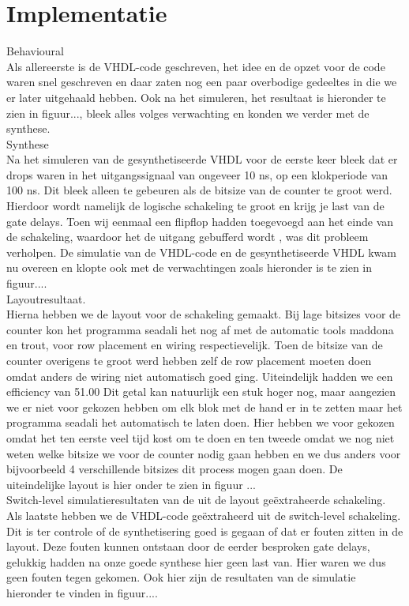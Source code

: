 \documentclass[11pt,twoside,a4paper]{article}
\begin{document}
\section{Implementatie}

Behavioural\\
Als allereerste is de VHDL-code geschreven, het idee en de opzet voor de code waren snel geschreven en daar zaten nog een paar overbodige gedeeltes in die we er later uitgehaald hebben.
Ook na het simuleren, het resultaat is hieronder te zien in figuur..., bleek alles volges verwachting en konden we verder met de synthese.\\

Synthese\\
Na het simuleren van de gesynthetiseerde VHDL voor de eerste keer bleek dat er drops waren in het uitgangssignaal van ongeveer 10 ns, op een klokperiode van 100 ns. 
Dit bleek alleen te gebeuren als de bitsize van de counter te groot werd. Hierdoor wordt namelijk de logische schakeling te groot en krijg je last van de gate delays.
Toen wij eenmaal een flipflop hadden toegevoegd aan het einde van de schakeling, waardoor het de uitgang gebufferd wordt , was dit probleem verholpen. 
De simulatie van de VHDL-code en de gesynthetiseerde VHDL kwam nu overeen en klopte ook met de verwachtingen zoals hieronder is te zien in figuur....\\

Layoutresultaat.\\
Hierna hebben we de layout voor de schakeling gemaakt. Bij lage bitsizes voor de counter kon het programma seadali het nog af met de automatic tools maddona en trout, voor row placement en wiring respectievelijk.
Toen de bitsize van de counter overigens te groot werd hebben zelf de row placement moeten doen omdat anders de wiring niet automatisch goed ging. Uiteindelijk hadden we een efficiency van 51.00%
Dit getal kan natuurlijk een stuk hoger nog, maar aangezien we er niet voor gekozen hebben om elk blok met de hand er in te zetten maar het programma seadali het automatisch te laten doen. Hier hebben we voor gekozen omdat 
het ten eerste veel tijd kost om te doen en ten tweede omdat we nog niet weten welke bitsize we voor de counter nodig gaan hebben en we dus anders voor bijvoorbeeld 4 verschillende bitsizes dit process mogen gaan doen.
De uiteindelijke layout is hier onder te zien in figuur ...\\

Switch-level simulatieresultaten van de uit de layout geëxtraheerde schakeling.\\
Als laatste hebben we de VHDL-code geëxtraheerd uit de switch-level schakeling. Dit is ter controle of de synthetisering goed is gegaan of dat er fouten zitten in de layout.
Deze fouten kunnen ontstaan door de eerder besproken gate delays, gelukkig hadden na onze goede synthese hier geen last van. Hier waren we dus geen fouten tegen gekomen.
Ook hier zijn de resultaten van de simulatie hieronder te vinden in figuur....\\
\end{document}
